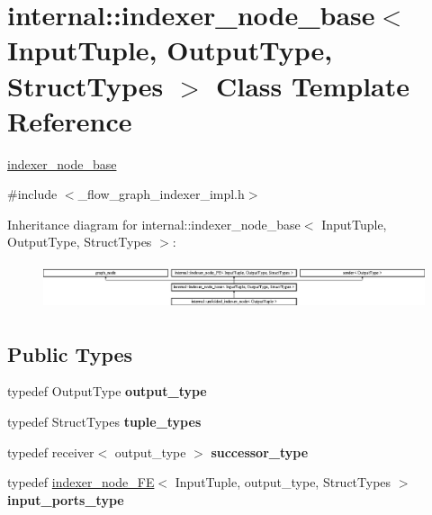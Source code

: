 \hypertarget{classinternal_1_1indexer__node__base}{}\section{internal\+:\+:indexer\+\_\+node\+\_\+base$<$ Input\+Tuple, Output\+Type, Struct\+Types $>$ Class Template Reference}
\label{classinternal_1_1indexer__node__base}


\hyperlink{classinternal_1_1indexer__node__base}{indexer\+\_\+node\+\_\+base}  




{\ttfamily \#include $<$\+\_\+flow\+\_\+graph\+\_\+indexer\+\_\+impl.\+h$>$}

Inheritance diagram for internal\+:\+:indexer\+\_\+node\+\_\+base$<$ Input\+Tuple, Output\+Type, Struct\+Types $>$\+:\begin{figure}[H]
\begin{center}
\leavevmode
\includegraphics[height=1.362530cm]{classinternal_1_1indexer__node__base}
\end{center}
\end{figure}
\subsection*{Public Types}
\begin{DoxyCompactItemize}
\item 
\hypertarget{classinternal_1_1indexer__node__base_a123574b541135589d9ffaf9806926510}{}typedef Output\+Type {\bfseries output\+\_\+type}\label{classinternal_1_1indexer__node__base_a123574b541135589d9ffaf9806926510}

\item 
\hypertarget{classinternal_1_1indexer__node__base_a0ed4edb17cc20e1052a6618db0bf8d2f}{}typedef Struct\+Types {\bfseries tuple\+\_\+types}\label{classinternal_1_1indexer__node__base_a0ed4edb17cc20e1052a6618db0bf8d2f}

\item 
\hypertarget{classinternal_1_1indexer__node__base_a4bc4239024bf233b3293ff0508ae43f3}{}typedef receiver$<$ output\+\_\+type $>$ {\bfseries successor\+\_\+type}\label{classinternal_1_1indexer__node__base_a4bc4239024bf233b3293ff0508ae43f3}

\item 
\hypertarget{classinternal_1_1indexer__node__base_ae68ca39f2a5719e45e1b28e814826800}{}typedef \hyperlink{classinternal_1_1indexer__node__FE}{indexer\+\_\+node\+\_\+\+F\+E}$<$ Input\+Tuple, output\+\_\+type, Struct\+Types $>$ {\bfseries input\+\_\+ports\+\_\+type}\label{classinternal_1_1indexer__node__base_ae68ca39f2a5719e45e1b28e814826800}

\end{DoxyCompactItemize}
